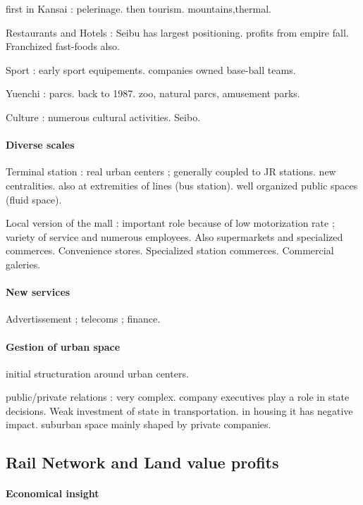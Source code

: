 first in Kansai : pelerinage. then tourism. mountains,thermal.

Restaurants and Hotels : Seibu has largest positioning. profits from empire fall. Franchized fast-foods also.

Sport : early sport equipements. companies owned base-ball teams.

Yuenchi : parcs. back to 1987. zoo, natural parcs, amusement parks. 

Culture : numerous cultural activities. Seibo.

\paragraph{Diverse scales}

Terminal station : real urban centers ; generally coupled to JR stations. new centralities. also at extremities of lines (bus station). well organized public spaces (fluid space).

Local version of the mall : important role because of low motorization rate ; variety of service and numerous employees. Also supermarkets and specialized commerces. Convenience stores. Specialized station commerces. Commercial galeries.

\paragraph{New services}

Advertissement ; telecoms ; finance.

\paragraph{Gestion of urban space}

initial structuration around urban centers.

public/private relations : very complex. company executives play a role in state decisions. Weak investment of state in transportation. in housing it has negative impact. suburban space mainly shaped by private companies.




\subsection{Rail Network and Land value profits}

\paragraph{Economical insight}

